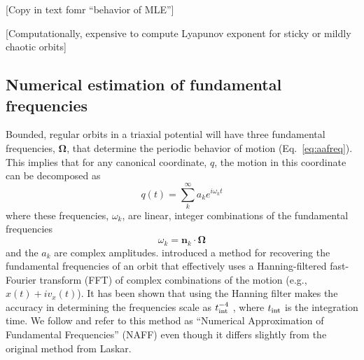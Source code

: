 \documentclass[letterpaper,12pt,preprint]{aastex}
\newcommand{\bs}[1]{\boldsymbol{#1}}
\newcommand{\inttime}{t_{\rm int}}
\begin{document}
[Copy in text fomr ``behavior of MLE'']

[Computationally, expensive to compute Lyapunov exponent for sticky or mildly chaotic orbits]

\subsection{Numerical estimation of fundamental frequencies}

Bounded, regular orbits in a triaxial potential will have three fundamental frequencies, $\bs{\Omega}$, that determine the periodic behavior of motion (Eq.~\ref{eq:aafreq}). This implies that for any canonical coordinate, $q$, the motion in this coordinate can be decomposed as 
\begin{equation}
	q(t) = \sum^\infty_k a_k e^{i \omega_k t}
\end{equation}
where these frequencies, $\omega_k$, are linear, integer combinations of the fundamental frequencies
\begin{equation}
	\omega_k = \bs{n}_k \cdot \bs{\Omega}
\end{equation}
and the $a_k$ are complex amplitudes. \cite{laskar93} introduced a method for recovering the fundamental frequencies of an orbit that effectively uses a Hanning-filtered fast-Fourier transform (FFT) of complex combinations of the motion (e.g., $x(t) + i v_x(t)$). It has been shown that using the Hanning filter makes the accuracy in determining the frequencies scale as $\inttime^{-4}$ \citep{laskar99}, where $\inttime$ is the integration time. We follow \cite{valluri98} and refer to this method as ``Numerical Approximation of Fundamental Frequencies'' (NAFF) even though it differs slightly from the original method from Laskar.
\end{document}
